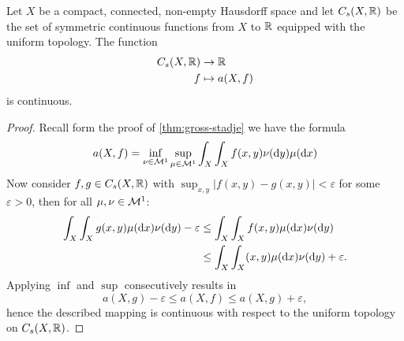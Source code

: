 \begin{corollary}\label{cor:continuous}
	Let $X$ be a compact, connected, non-empty Hausdorff space and let $C_s(X,\mathbb{R})$ be the set of symmetric continuous functions from $X$ to $\mathbb{R}$ equipped with the uniform topology. The function
	\begin{align*}
		C_s(X,\mathbb{R})&\to \mathbb{R}
		\\
		f&\mapsto a(X,f)
	\end{align*}
	is continuous.
\end{corollary}

\begin{proof}
	Recall form the proof of \autoref{thm:gross-stadje} we have the formula\[
	a(X,f)=\inf_{\nu\in\mathcal{M}^1}\sup_{\mu\in\mathcal{M}^1}\int_X\int_X f(x,y)\nu(\mathrm{d}y)\mu(\mathrm{d}x)
	\]
%	
Now consider $f,g\in C_s(X,\mathbb{R})$ with $\sup_{x,y}|f(x,y)-g(x,y)|<\varepsilon$ for some $\varepsilon>0$, then for all $\mu,\nu\in \mathcal{M}^1$:
\begin{align*}
	\int_X\int_Xg(x,y)\mu(\mathrm{d}x)\nu(\mathrm{d}y)-\varepsilon&\leq\int_X\int_Xf(x,y)\mu(\mathrm{d}x)\nu(\mathrm{d}y)\\
	&\leq\int_X\int_X(x,y)\mu(\mathrm{d}x)\nu(\mathrm{d}y)+\varepsilon.
\end{align*}
Applying $\inf$ and $\sup$ consecutively results in
\[
a(X,g)-\varepsilon\leq a(X,f)\leq a(X,g)+\varepsilon,
\]
hence the described mapping is continuous with respect to the uniform topology on $C_s(X,\mathbb{R})$.
\end{proof}